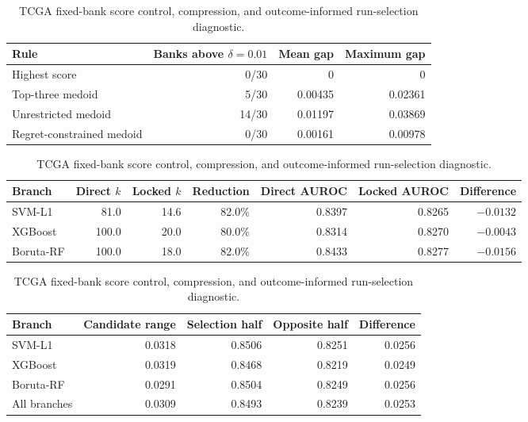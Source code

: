 \begin{table}[p]
\centering
\caption{TCGA fixed-bank score control, compression, and outcome-informed run-selection diagnostic.}
\label{tab:supp31}
\small
\setlength{\tabcolsep}{5pt}
\renewcommand{\arraystretch}{1.18}
\begin{tabular}{lrrr}
\toprule
Rule & Banks above $\delta=0.01$ & Mean gap & Maximum gap \\
\midrule
Highest score & 0/30 & 0 & 0 \\
Top-three medoid & 5/30 & 0.00435 & 0.02361 \\
Unrestricted medoid & 14/30 & 0.01197 & 0.03869 \\
Regret-constrained medoid & 0/30 & 0.00161 & 0.00978 \\
\bottomrule
\end{tabular}

\medskip
{}
\begin{tabular}{lrrrrrr}
\toprule
Branch & Direct $k$ & Locked $k$ & Reduction & Direct AUROC & Locked AUROC & Difference \\
\midrule
SVM-L1 & 81.0 & 14.6 & 82.0\% & 0.8397 & 0.8265 & $-0.0132$ \\
XGBoost & 100.0 & 20.0 & 80.0\% & 0.8314 & 0.8270 & $-0.0043$ \\
Boruta-RF & 100.0 & 18.0 & 82.0\% & 0.8433 & 0.8277 & $-0.0156$ \\
\bottomrule
\end{tabular}

\medskip
{}
\begin{tabular}{lrrrr}
\toprule
Branch & Candidate range & Selection half & Opposite half & Difference \\
\midrule
SVM-L1 & 0.0318 & 0.8506 & 0.8251 & 0.0256 \\
XGBoost & 0.0319 & 0.8468 & 0.8219 & 0.0249 \\
Boruta-RF & 0.0291 & 0.8504 & 0.8249 & 0.0256 \\
All branches & 0.0309 & 0.8493 & 0.8239 & 0.0253 \\
\bottomrule
\end{tabular}


\end{table}
